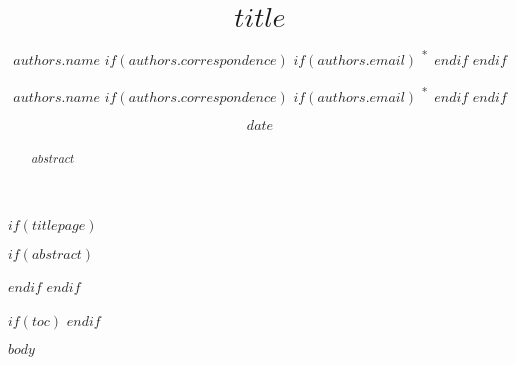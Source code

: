 \documentclass[11pt,a4paper]{article}
\title{$title$}
\author[%
                    $for(authors.institute)$%
                        $authors.institute$$sep$,%
                    $endfor$%
                    ]{$authors.name$%
                    $if(authors.correspondence)$%
                        $if(authors.email)$%
                            \textsuperscript{*\,}%
                        $endif$%
                    $endif$%
                }
\affil[$institutes.index$]{$institutes.name$}
\author{$authors.name$%
        $if(authors.correspondence)$%
            $if(authors.email)$%
                \textsuperscript{*\,}%
            $endif$%
        $endif$%
        }
\affil{}
\date{$date$}
\begin{document}
$if(titlepage)$
\maketitle
$if(abstract)$
\begin{abstract}
$abstract$
\end{abstract}
$endif$
\thispagestyle{empty}
\restoregeometry
\newpage
$endif$

$if(toc)$
\newpage
\tableofcontents
\newpage
$endif$

$body$
\end{document}

